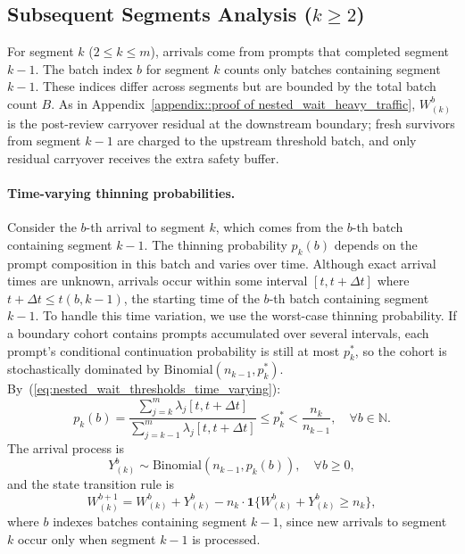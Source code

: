 \subsection{Subsequent Segments Analysis ($k \geq 2$)}

For segment $k$ ($2\leq k\leq m$), arrivals come from prompts that completed segment $k-1$. The batch index $b$ for segment $k$ counts only batches containing segment $k-1$. These indices differ across segments but are bounded by the total batch count $B$. As in Appendix~\ref{appendix::proof of nested_wait_heavy_traffic}, \(W^b_{(k)}\) is the post-review carryover residual at the downstream boundary; fresh survivors from segment \(k-1\) are charged to the upstream threshold batch, and only residual carryover receives the extra safety buffer.

\paragraph{Time-varying thinning probabilities.} Consider the $b$-th arrival to segment $k$, which comes from the $b$-th batch containing segment $k-1$. The thinning probability $p_k(b)$ depends on the prompt composition in this batch and varies over time. Although exact arrival times are unknown, arrivals occur within some interval $[t, t+\Delta t]$ where $t+\Delta t \leq t(b,k-1)$, the starting time of the $b$-th batch containing segment $k-1$. To handle this time variation, we use the worst-case thinning probability. If a boundary cohort contains prompts accumulated over several intervals, each prompt's conditional continuation probability is still at most \(p_k^*\), so the cohort is stochastically dominated by \(\mathrm{Binomial}(n_{k-1},p_k^*)\). By~(\ref{eq:nested_wait_thresholds_time_varying}):
$$p_k(b) = \frac{\sum_{j=k}^m \lambda_j[ t, t+\Delta t ]}{\sum_{j=k-1}^m \lambda_j[ t, t+\Delta t ]}\leq p_k^* < \frac{n_k}{n_{k-1}}, \quad \forall b \in \mathbb{N}.$$
The arrival process is
$$Y_{(k)}^b \sim \text{Binomial}(n_{k-1},p_k(b)),\quad \forall b\geq 0,$$
and the state transition rule is
$$W_{(k)}^{b+1} = W_{(k)}^{b} + Y_{(k)}^{b} - n_k \cdot\mathbf{1}\{ W_{(k)}^{b} + Y_{(k)}^{b}\geq n_k \}, $$
where $b$ indexes batches containing segment $k-1$, since new arrivals to segment $k$ occur only when segment $k-1$ is processed.

